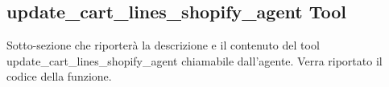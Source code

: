 \subsection{update\_cart\_lines\_shopify\_agent Tool}

Sotto-sezione che riporterà la descrizione e il contenuto del tool update\_cart\_lines\_shopify\_agent chiamabile dall'agente.
Verra riportato il codice della funzione.